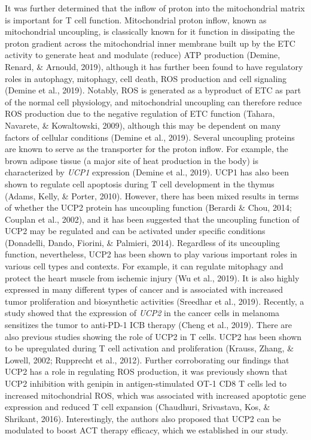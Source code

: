 \documentclass[12pt,twoside,openany,\mydriver]{thesis}  %
\begin{document}
It was further determined that the inflow of proton into the mitochondrial matrix is important for T cell function. Mitochondrial proton inflow, known as mitochondrial uncoupling, is classically known for it function in dissipating the proton gradient across the mitochondrial inner membrane built up by the ETC activity to generate heat and modulate (reduce) ATP production (Demine, Renard, \& Arnould, 2019), although it has further been found to have regulatory roles in autophagy, mitophagy, cell death, ROS production and cell signaling (Demine et al., 2019). Notably, ROS is generated as a byproduct of ETC as part of the normal cell physiology, and mitochondrial uncoupling can therefore reduce ROS production due to the negative regulation of ETC function (Tahara, Navarete, \& Kowaltowski, 2009), although this may be dependent on many factors of cellular conditions (Demine et al., 2019). Several uncoupling proteins are known to serve as the transporter for the proton inflow. For example, the brown adipose tissue (a major site of heat production in the body) is characterized by \emph{UCP1} expression (Demine et al., 2019). UCP1 has also been shown to regulate cell apoptosis during T cell development in the thymus (Adams, Kelly, \& Porter, 2010). However, there has been mixed results in terms of whether the UCP2 protein has uncoupling function (Berardi \& Chou, 2014; Couplan et al., 2002), and it has been suggested that the uncoupling function of UCP2 may be regulated and can be activated under specific conditions (Donadelli, Dando, Fiorini, \& Palmieri, 2014). Regardless of its uncoupling function, nevertheless, UCP2 has been shown to play various important roles in various cell types and contexts. For example, it can regulate mitophagy and protect the heart muscle from ischemic injury (Wu et al., 2019). It is also highly expressed in many different types of cancer and is associated with increased tumor proliferation and biosynthetic activities (Sreedhar et al., 2019). Recently, a study showed that the expression of \emph{UCP2} in the cancer cells in melanoma sensitizes the tumor to anti-PD-1 ICB therapy (Cheng et al., 2019). There are also previous studies showing the role of UCP2 in T cells. UCP2 has been shown to be upregulated during T cell activation and proliferation (Krauss, Zhang, \& Lowell, 2002; Rupprecht et al., 2012). Further corroborating our findings that UCP2 has a role in regulating ROS production, it was previously shown that UCP2 inhibition with genipin in antigen-stimulated OT-1 CD8 T cells led to increased mitochondrial ROS, which was associated with increased apoptotic gene expression and reduced T cell expansion (Chaudhuri, Srivastava, Kos, \& Shrikant, 2016). Interestingly, the authors also proposed that UCP2 can be modulated to boost ACT therapy efficacy, which we established in our study.
\end{document}
